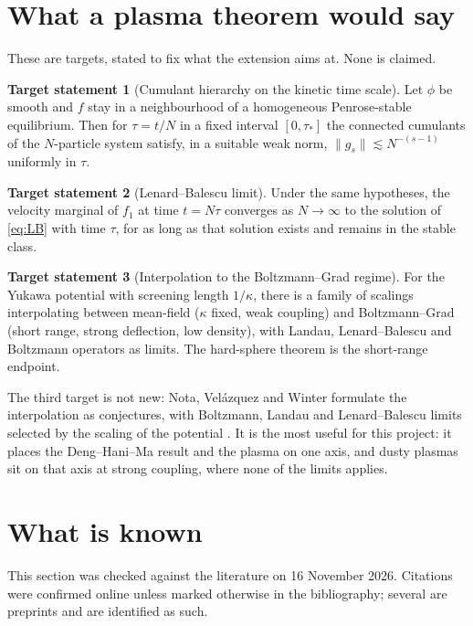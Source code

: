 \documentclass[11pt]{article}
\theoremstyle{definition}
\newtheorem{target}{Target statement}
\begin{document}
\section{What a plasma theorem would say}

These are targets, stated to fix what the extension aims at. None is claimed.

\begin{target}[Cumulant hierarchy on the kinetic time scale]
Let $\phi$ be smooth and $f$ stay in a neighbourhood of a homogeneous
Penrose-stable equilibrium. Then for $\tau = t/N$ in a fixed interval
$[0,\tau_*]$ the connected cumulants of the $N$-particle system satisfy, in a
suitable weak norm, $\|g_s\| \lesssim N^{-(s-1)}$ uniformly in $\tau$.
\end{target}

\begin{target}[Lenard--Balescu limit]
Under the same hypotheses, the velocity marginal of $f_1$ at time $t = N\tau$
converges as $N\to\infty$ to the solution of \eqref{eq:LB} with time
$\tau$, for as long as that solution exists and remains in the stable class.
\end{target}

\begin{target}[Interpolation to the Boltzmann--Grad regime]
For the Yukawa potential with screening length $1/\kappa$, there is a family
of scalings interpolating between mean-field ($\kappa$ fixed, weak coupling)
and Boltzmann--Grad (short range, strong deflection, low density), with
Landau, Lenard--Balescu and Boltzmann operators as limits. The hard-sphere
theorem is the short-range endpoint.
\end{target}

The third target is not new: Nota, Vel\'azquez and Winter formulate the
interpolation as conjectures, with Boltzmann, Landau and Lenard--Balescu
limits selected by the scaling of the potential \cite{NVW}. It is the most
useful for this project: it places the
Deng--Hani--Ma result and the plasma on one axis, and dusty plasmas sit on
that axis at strong coupling, where none of the limits applies.

\section{What is known}
\label{sec:known}

This section was checked against the literature on 16 November 2026.
Citations were confirmed online unless marked otherwise in the bibliography;
several are preprints and are identified as such.
\end{document}

